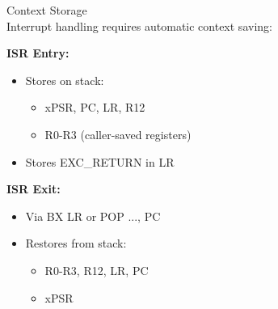 \begin{definition}{Context Storage}\\
Interrupt handling requires automatic context saving:

\textbf{ISR Entry:}
\begin{itemize}
  \item Stores on stack:
    \begin{itemize}
      \item xPSR, PC, LR, R12
      \item R0-R3 (caller-saved registers)
    \end{itemize}
  \item Stores EXC\_RETURN in LR
\end{itemize}

\textbf{ISR Exit:}
\begin{itemize}
  \item Via BX LR or POP {..., PC}
  \item Restores from stack:
    \begin{itemize}
      \item R0-R3, R12, LR, PC
      \item xPSR
    \end{itemize}
\end{itemize}
\end{definition}

